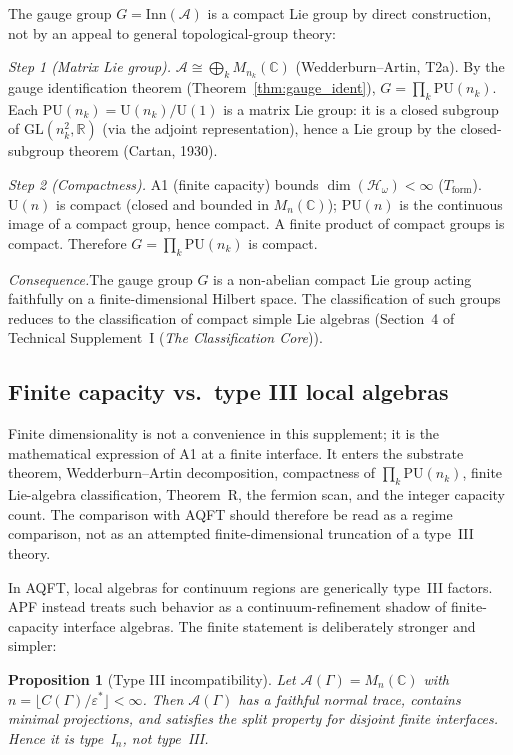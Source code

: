 \documentclass[11pt]{article}
\newtheorem{proposition}[theorem]{Proposition}
\theoremstyle{definition}
\newcommand{\TSI}{Technical Supplement~I (\emph{The Classification Core})}
\begin{document}
\noindent The gauge group $G = \mathrm{Inn}(\mathcal{A})$ is a compact
Lie group by direct construction, not by an appeal to general
topological-group theory:

\smallskip\noindent\textit{Step 1 (Matrix Lie group).}\quad
$\mathcal{A} \cong \bigoplus_k M_{n_k}(\mathbb{C})$ (Wedderburn--Artin,
T2a).  By the gauge identification theorem
(Theorem~\ref{thm:gauge_ident}),
$G = \prod_k \mathrm{PU}(n_k)$.  Each $\mathrm{PU}(n_k) =
\mathrm{U}(n_k) / \mathrm{U}(1)$ is a matrix Lie group: it is a
closed subgroup of $\mathrm{GL}(n_k^2, \mathbb{R})$ (via the adjoint
representation), hence a Lie group by the closed-subgroup theorem
(Cartan, 1930).

\smallskip\noindent\textit{Step 2 (Compactness).}\quad
A1 (finite capacity) bounds $\dim(\mathcal{H}_\omega) < \infty$
($T_{\mathrm{form}}$).  $\mathrm{U}(n)$ is compact (closed and bounded
in $M_n(\mathbb{C})$); $\mathrm{PU}(n)$ is the continuous image of a
compact group, hence compact.  A finite product of compact groups is
compact.  Therefore $G = \prod_k \mathrm{PU}(n_k)$ is compact.

\smallskip\noindent\textit{Consequence.}\quad The gauge group $G$ is a
non-abelian compact Lie group acting faithfully on a finite-dimensional
Hilbert space.  The classification of such groups reduces to the
classification of compact simple Lie algebras (Section~4 of \TSI{}).


\subsection{Finite capacity vs.\ type III local algebras}
\label{sec:finite_vs_typeIII}

Finite dimensionality is not a convenience in this supplement; it is the
mathematical expression of A1 at a finite interface.  It enters the
substrate theorem, Wedderburn--Artin decomposition, compactness of
$\prod_k\mathrm{PU}(n_k)$, finite Lie-algebra classification, Theorem~R,
the fermion scan, and the integer capacity count.  The comparison with
AQFT should therefore be read as a regime comparison, not as an attempted
finite-dimensional truncation of a type~III theory.

In AQFT, local algebras for continuum regions are generically type~III
factors.  APF instead treats such behavior as a continuum-refinement shadow
of finite-capacity interface algebras.  The finite statement is deliberately
stronger and simpler:

\begin{proposition}[Type III incompatibility]\label{prop:typeIII_incompat}
Let $\mathcal A(\Gamma)=M_n(\mathbb C)$ with
$n=\lfloor C(\Gamma)/\varepsilon^*\rfloor<\infty$.  Then
$\mathcal A(\Gamma)$ has a faithful normal trace, contains minimal
projections, and satisfies the split property for disjoint finite
interfaces.  Hence it is type~I$_n$, not type~III.
\end{proposition}
\end{document}
